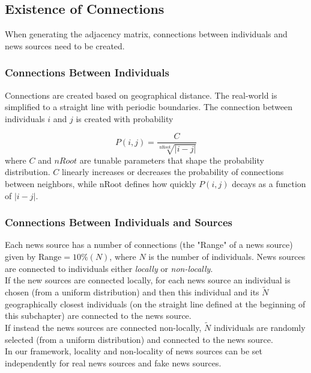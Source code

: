 \subsection{Existence of Connections}
\label{subsec:connections_existence}
When generating the adjacency matrix, connections between individuals and news sources need to be created.
\subsubsection{Connections Between Individuals}
\label{subsub: connections}
Connections are created based on geographical distance. The real-world is simplified to a straight line with periodic boundaries. The connection between individuals $i$ and $j$ is created with probability 

\begin{equation}
P(i,j) = \frac{C}{\sqrt[\text{nRoot}]{\vert i-j\vert}}
\end{equation}
where $C$ and $nRoot$ are tunable parameters that shape the probability distribution. $C$ linearly increases or decreases the probability of connections between neighbors, while $\text{nRoot}$ defines how quickly $P(i,j)$ decays as a function of $\vert i-j \vert$.

\subsubsection{Connections Between Individuals and Sources}
Each news source has a number of connections (the "Range" of a news source) given by $\text{Range} = 10\% (N)$, where $N$ is the number of individuals.
News sources are connected to individuals either \textit{locally} or \textit{non-locally}. 
\\If the new sources are connected locally, for each news source an individual is chosen (from a uniform distribution) and then this individual and its $\tilde{N}$ geographically closest individuals (on the straight line defined at the beginning of this subchapter) are connected to the news source.
\\If instead the news sources are connected non-locally, $\tilde{N}$ individuals are randomly selected (from a uniform distribution) and connected to the news source.
\\In our framework, locality and non-locality of news sources can be set independently for real news sources and fake news sources.



